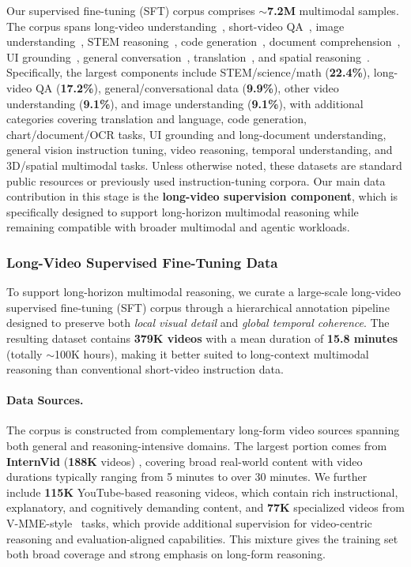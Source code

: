 \documentclass[11pt, letterpaper]{template}
\theoremstyle{plain}
\theoremstyle{definition}
\theoremstyle{remark}
\begin{document}
Our supervised fine-tuning (SFT) corpus comprises $\sim$\textbf{7.2M} multimodal samples. The corpus spans long-video understanding~\citep{zhang2024llava}, short-video QA~\citep{caba2015activitynet}, image understanding~\citep{mscoco,lei2018tvqa}, STEM reasoning~\citep{kuckreja2024geochat}, code generation~\citep{gui2025webcode2m}, document comprehension~\citep{mathew2021docvqa,masry2023unichart}, UI grounding~\citep{cheng2024seeclick}, general conversation~\citep{zhang2024llava}, translation~\citep{penedo2026finetranslations}, and spatial reasoning~\citep{yang2025cambrian}. Specifically, the largest components include STEM/science/math (\textbf{22.4\%}), long-video QA (\textbf{17.2\%}), general/conversational data (\textbf{9.9\%}), other video understanding (\textbf{9.1\%}), and image understanding (\textbf{9.1\%}), with additional categories covering translation and language, code generation, chart/document/OCR tasks, UI grounding and long-document understanding, general vision instruction tuning, video reasoning, temporal understanding, and 3D/spatial multimodal tasks. Unless otherwise noted, these datasets are standard public resources or previously used instruction-tuning corpora. Our main data contribution in this stage is the \textbf{long-video supervision component}, which is specifically designed to support long-horizon multimodal reasoning while remaining compatible with broader multimodal and agentic workloads.

\subsubsection{Long-Video Supervised Fine-Tuning Data}

To support long-horizon multimodal reasoning, we curate a large-scale long-video supervised fine-tuning (SFT) corpus through a hierarchical annotation pipeline designed to preserve both \emph{local visual detail} and \emph{global temporal coherence}. The resulting dataset contains \textbf{379K videos} with a mean duration of \textbf{15.8 minutes} (totally $\sim$100K hours), making it better suited to long-context multimodal reasoning than conventional short-video instruction data.

\paragraph{Data Sources.}
The corpus is constructed from complementary long-form video sources spanning both general and reasoning-intensive domains. The largest portion comes from \textbf{InternVid} (\textbf{188K} videos) \citep{wang2023internvid}, covering broad real-world content with video durations typically ranging from 5 minutes to over 30 minutes. We further include \textbf{115K} YouTube-based reasoning videos, which contain rich instructional, explanatory, and cognitively demanding content, and \textbf{77K} specialized videos from V-MME-style~\citep{videomme} tasks, which provide additional supervision for video-centric reasoning and evaluation-aligned capabilities. This mixture gives the training set both broad coverage and strong emphasis on long-form reasoning.
\end{document}
